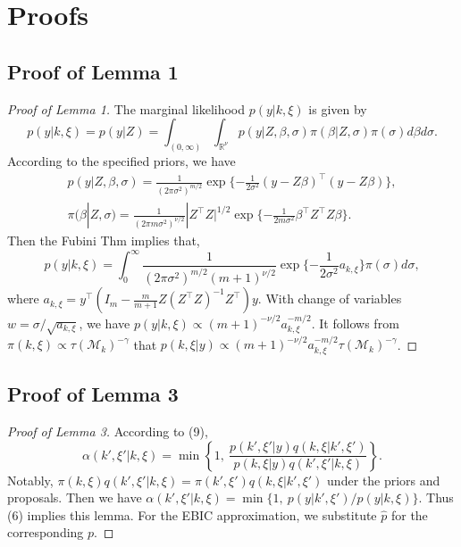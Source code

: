 \newpage
\section{Proofs}
\subsection{Proof of Lemma 1}

\begin{proof}[Proof of Lemma 1]
    The marginal likelihood $p(y|k,\xi)$ is given by
    \begin{equation*}
        p(y|k,\xi)=p(y|Z) = \int_{(0,\infty)} \int_{\mathbb{R}^\nu} p(y|Z,\beta,\sigma) \pi(\beta|Z,\sigma)\pi(\sigma) d\beta d\sigma.
    \end{equation*}
    According to the specified priors, we have
    \begin{equation*}
        \begin{split}
            p(y|Z,\beta,\sigma) = \frac{1}{(2\pi\sigma^2)^{m/2}}\exp\{-\frac{1}{2\sigma^2}(y-Z\beta)^\top(y-Z\beta)\},\\
            \pi(\beta|Z,\sigma) = \frac{1}{(2\pi m \sigma^2)^{\nu/2}}|Z^\top Z|^{1/2}\exp \{ -\frac{1}{2m\sigma^2} \beta^\top Z^\top Z\beta\}.
        \end{split}
    \end{equation*}
    Then the Fubini Thm implies that,
    \begin{equation*}
        p(y|k,\xi) = \int_0^\infty \frac{1}{(2\pi \sigma^2)^{m/2} (m+1)^{\nu/2} } \exp \{-\frac{1}{2\sigma^2} a_{k,\xi}\} \pi(\sigma) d\sigma,
    \end{equation*}
    where $a_{k,\xi}=y^\top (I_m-\frac{m}{m+1}Z(Z^\top Z)^{-1}Z^\top)y$. With change of variables $w = \sigma / \sqrt{a_{k,\xi}}$, we have $p(y|k,\xi)\propto (m+1)^{-\nu/2}a_{k,\xi}^{-m/2}$. It follows from $\pi(k,\xi)\propto \tau(\mathcal{M}_k)^{-\gamma}$ that $p(k,\xi|y)\propto (m+1)^{-\nu/2}a_{k,\xi}^{-m/2}\tau(\mathcal{M}_k)^{-\gamma}$.
\end{proof}

\subsection{Proof of Lemma 3}

\begin{proof}[Proof of Lemma 3]
    According to (9),
    \begin{equation*}
        \alpha(k',\xi'|k,\xi) = \min \left\{1,~ \frac{p(k',\xi'|y)q(k,\xi|k',\xi')}{p(k,\xi|y)q(k',\xi'|k,\xi)}\right\}.
    \end{equation*}
    Notably, $\pi(k,\xi)q(k',\xi'|k,\xi)=\pi(k',\xi')q(k,\xi|k',\xi')$ under the priors and proposals. Then we have $\alpha(k',\xi'|k,\xi) = \min\{1,~ p(y|k',\xi')/p(y|k,\xi)\}$. Thus (6) implies this lemma. For the EBIC approximation, we substitute $\hat{p}$ for the corresponding $p$.
\end{proof}


